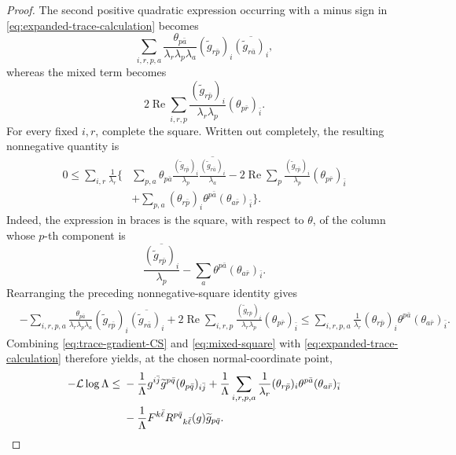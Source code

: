 \documentclass[10pt,a4paper]{amsart}
\begin{document}
\begin{proof}
The second positive quadratic expression occurring with a minus sign
in \eqref{eq:expanded-trace-calculation} becomes
\[
 \sum_{i,r,p,a}\frac{\theta_{p\bar a}}
 {\lambda_r\lambda_p\lambda_a}
 (\widetilde g_{r\bar p})_i
 \overline{(\widetilde g_{r\bar a})_i},
\]
whereas the mixed term becomes
\[
 2\operatorname{Re}\sum_{i,r,p}
 \frac{(\widetilde g_{r\bar p})_i}{\lambda_r\lambda_p}
 (\theta_{p\bar r})_{\bar i}.
\]
For every fixed $i,r$, complete the square.  Written out completely,
the resulting nonnegative quantity is
\begin{align*}
0\leq\sum_{i,r}\frac1{\lambda_r}\Biggl\{&
 \sum_{p,a}\theta_{p\bar a}
 \frac{(\widetilde g_{r\bar p})_i}{\lambda_p}
 \overline{\frac{(\widetilde g_{r\bar a})_i}{\lambda_a}}
 -2\operatorname{Re}\sum_p
 \frac{(\widetilde g_{r\bar p})_i}{\lambda_p}
 (\theta_{p\bar r})_{\bar i}\\
&+\sum_{p,a}(\theta_{r\bar p})_i\theta^{p\bar a}
 (\theta_{a\bar r})_{\bar i}\Biggr\}.
\end{align*}
Indeed, the expression in braces is the square, with respect to
$\theta$, of the column whose $p$-th component is
\[
 \frac{\overline{(\widetilde g_{r\bar p})_i}}{\lambda_p}
 -\sum_a\theta^{p\bar a}(\theta_{a\bar r})_{\bar i}.
\]
Rearranging the preceding nonnegative-square identity gives
\begin{align}
&-\sum_{i,r,p,a}\frac{\theta_{p\bar a}}
 {\lambda_r\lambda_p\lambda_a}
 (\widetilde g_{r\bar p})_i
 \overline{(\widetilde g_{r\bar a})_i}
 +2\operatorname{Re}\sum_{i,r,p}
 \frac{(\widetilde g_{r\bar p})_i}{\lambda_r\lambda_p}
 (\theta_{p\bar r})_{\bar i}
 \leq
 \sum_{i,r,p,a}\frac1{\lambda_r}
 (\theta_{r\bar p})_i\theta^{p\bar a}
 (\theta_{a\bar r})_{\bar i}.
\label{eq:mixed-square}
\end{align}
  Combining \eqref{eq:trace-gradient-CS} and
\eqref{eq:mixed-square} with
\eqref{eq:expanded-trace-calculation} therefore yields, at the chosen
normal-coordinate point,
\begin{align}
-\mathcal L\log\Lambda\leq{}&
-\frac1\Lambda g^{i\bar j}\widetilde g^{p\bar q}
 (\theta_{p\bar q})_{i\bar j}
 +\frac1\Lambda\sum_{i,r,p,a}\frac1{\lambda_r}
 (\theta_{r\bar p})_i\theta^{p\bar a}
 (\theta_{a\bar r})_{\bar i}\notag\\
&-\frac1\Lambda F^{k\bar\ell}
 R^{p\bar q}{}_{k\bar\ell}(g)\widetilde g_{p\bar q}.
\label{eq:surviving-coefficients}
\end{align}


\end{proof}
\end{document}
